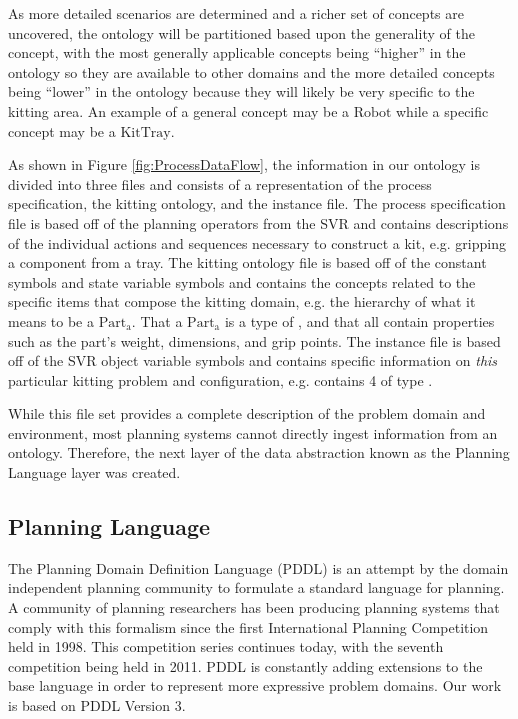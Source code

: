 As more detailed scenarios are determined and a richer set of concepts are uncovered, the ontology will be partitioned based upon the generality of the concept, with the most generally applicable concepts being ``higher'' in the ontology so they are available to other domains and the more detailed concepts being ``lower'' in the ontology because they will likely be very specific to the kitting area. An example of a general concept may be a $\mathrm{Robot}$ while a specific concept may be a $\mathrm{KitTray}$.

As shown in Figure \ref{fig:ProcessDataFlow}, the information in our ontology is divided into three files and consists of a representation of the process specification,
the kitting ontology, and the instance file. The process specification file is based off of the planning operators from the SVR and contains descriptions of
the individual actions and sequences necessary to construct a kit, e.g. gripping a component from a tray. The kitting ontology file is based off of the constant symbols and
state variable symbols and contains the concepts related to the specific items
that compose the kitting domain, e.g. the hierarchy of what it means to be a $\mathrm{Part_a}$. That a $\mathrm{Part_a}$ is a type of , and that
all  contain properties such as the part's weight, dimensions, and grip points. The instance file is based off of the SVR object variable symbols and
contains specific information on {\it this} particular kitting problem and configuration, e.g.   contains 4  of type .

While this file set provides a complete description of the problem domain and environment, most planning systems cannot directly ingest information from an ontology.
Therefore, the next layer of the data abstraction known as the Planning Language layer was created.

\subsection{Planning Language}
The Planning Domain Definition Language (PDDL) \cite{PDDL} is an attempt by the domain independent planning community to formulate a standard language for planning. A community
of planning researchers has been producing planning systems that comply with this formalism since the first International Planning Competition held in 1998. This competition series
continues today, with the seventh competition being held in 2011. PDDL is constantly adding extensions to the base language in order to represent more expressive problem domains. Our
work is based on PDDL Version  3.

